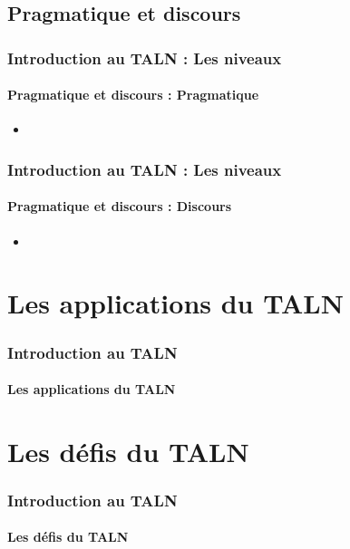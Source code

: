 \documentclass{beamer}
\begin{document}
\subsection{Pragmatique et discours}

\begin{frame}
\frametitle{Introduction au TALN : Les niveaux}
\framesubtitle{Pragmatique et discours : Pragmatique}

\begin{itemize}
	\item 
\end{itemize}

\end{frame}

\begin{frame}
\frametitle{Introduction au TALN : Les niveaux}
\framesubtitle{Pragmatique et discours : Discours}

\begin{itemize}
	\item 
\end{itemize}

\end{frame}

\section{Les applications du TALN}

\begin{frame}
\frametitle{Introduction au TALN}
\framesubtitle{Les applications du TALN}

\end{frame}

\section{Les défis du TALN}

\begin{frame}
\frametitle{Introduction au TALN}
\framesubtitle{Les défis du TALN}

\end{frame}



\end{document}
